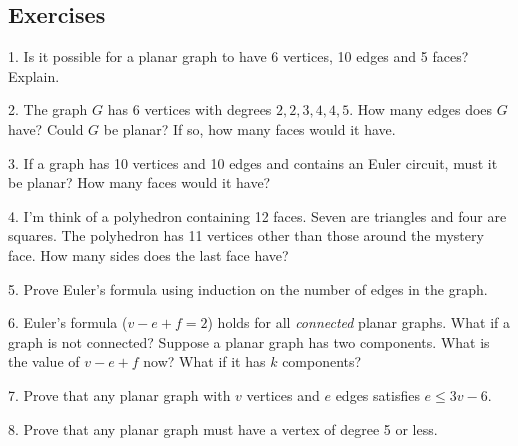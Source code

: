 \documentclass[10pt,]{book}
\theoremstyle{plain}
\theoremstyle{definition}
\theoremstyle{definition}
\theoremstyle{definition}
\numberwithin{equation}{chapter}
\begin{document}
\subsection[Exercises]{Exercises}\label{exercises-26}
\begin{exerciselist}
\item[1.]\hypertarget{exercise-272}{}
Is it possible for a planar graph to have 6 vertices, 10 edges and 5 faces? Explain.
%
\par\smallskip
\item[2.]\hypertarget{exercise-273}{}
The graph \(G\) has 6 vertices with degrees \(2, 2, 3, 4, 4, 5\). How many edges does \(G\) have? Could \(G\) be planar? If so, how many faces would it have.
%
\par\smallskip
\item[3.]\hypertarget{exercise-274}{}
If a graph has 10 vertices and 10 edges and contains an Euler circuit, must it be planar? How many faces would it have?
%
\par\smallskip
\item[4.]\hypertarget{exercise-275}{}
I'm think of a polyhedron containing 12 faces. Seven are triangles and four are squares. The polyhedron has 11 vertices other than those around the mystery face. How many sides does the last face have?
%
\par\smallskip
\item[5.]\hypertarget{exercise-276}{}
Prove Euler's formula using induction on the number of edges in the graph.
%
\par\smallskip
\item[6.]\hypertarget{exercise-277}{}
Euler's formula (\(v - e + f = 2\)) holds for all \emph{connected} planar graphs. What if a graph is not connected? Suppose a planar graph has two components. What is the value of \(v - e + f\) now? What if it has \(k\) components?
%
\par\smallskip
\item[7.]\hypertarget{exercise-278}{}
Prove that any planar graph with \(v\) vertices and \(e\) edges satisfies \(e \le 3v - 6\).
%
\par\smallskip
\item[8.]\hypertarget{exercise-279}{}
Prove that any planar graph must have a vertex of degree 5 or less.
%
\par\smallskip
\end{exerciselist}
\typeout{************************************************}
\typeout{************************************************}
\end{document}
